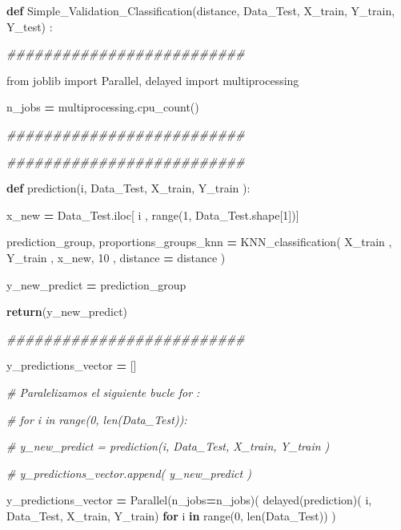 \documentclass[
  11pt,
  a4paper,
]{article}
\newenvironment{Shaded}{\begin{snugshade}}{\end{snugshade}}
\newcommand{\BuiltInTok}[1]{#1}
\newcommand{\CommentTok}[1]{\textcolor[rgb]{0.56,0.35,0.01}{\textit{#1}}}
\newcommand{\ControlFlowTok}[1]{\textcolor[rgb]{0.13,0.29,0.53}{\textbf{#1}}}
\newcommand{\DecValTok}[1]{\textcolor[rgb]{0.00,0.00,0.81}{#1}}
\newcommand{\ImportTok}[1]{#1}
\newcommand{\KeywordTok}[1]{\textcolor[rgb]{0.13,0.29,0.53}{\textbf{#1}}}
\newcommand{\NormalTok}[1]{#1}
\newcommand{\OperatorTok}[1]{\textcolor[rgb]{0.81,0.36,0.00}{\textbf{#1}}}
\begin{document}
\begin{Shaded}
\begin{Highlighting}[]
\KeywordTok{def}\NormalTok{ Simple\_Validation\_Classification(distance, Data\_Test, X\_train, Y\_train, Y\_test) :}

    \CommentTok{\#\#\#\#\#\#\#\#\#\#\#\#\#\#\#\#\#\#\#\#\#\#\#\#\#\#}

    \ImportTok{from}\NormalTok{ joblib }\ImportTok{import}\NormalTok{ Parallel, delayed}
    \ImportTok{import}\NormalTok{ multiprocessing}

\NormalTok{    n\_jobs  }\OperatorTok{=}\NormalTok{ multiprocessing.cpu\_count()}

    \CommentTok{\#\#\#\#\#\#\#\#\#\#\#\#\#\#\#\#\#\#\#\#\#\#\#\#\#\#}

    \CommentTok{\#\#\#\#\#\#\#\#\#\#\#\#\#\#\#\#\#\#\#\#\#\#\#\#\#\#}

    \KeywordTok{def}\NormalTok{ prediction(i, Data\_Test, X\_train, Y\_train ):}

\NormalTok{     x\_new }\OperatorTok{=}\NormalTok{ Data\_Test.iloc[ i , }\BuiltInTok{range}\NormalTok{(}\DecValTok{1}\NormalTok{, Data\_Test.shape[}\DecValTok{1}\NormalTok{])]}

\NormalTok{     prediction\_group, proportions\_groups\_knn  }\OperatorTok{=}\NormalTok{  KNN\_classification( X\_train , Y\_train , x\_new, }\DecValTok{10}\NormalTok{ , distance }\OperatorTok{=}\NormalTok{ distance )}
     
\NormalTok{     y\_new\_predict }\OperatorTok{=}\NormalTok{ prediction\_group}

     \ControlFlowTok{return}\NormalTok{(y\_new\_predict)}

    \CommentTok{\#\#\#\#\#\#\#\#\#\#\#\#\#\#\#\#\#\#\#\#\#\#\#\#\#\#}

\NormalTok{    y\_predictions\_vector }\OperatorTok{=}\NormalTok{ []}

    \CommentTok{\# Paralelizamos el siguiente bucle for :}

    \CommentTok{\# for i in  range(0, len(Data\_Test)):}

        \CommentTok{\# y\_new\_predict = prediction(i, Data\_Test, X\_train, Y\_train )}

        \CommentTok{\# y\_predictions\_vector.append( y\_new\_predict )}

    
\NormalTok{    y\_predictions\_vector }\OperatorTok{=}\NormalTok{ Parallel(n\_jobs}\OperatorTok{=}\NormalTok{n\_jobs)( delayed(prediction)( i, Data\_Test, X\_train, Y\_train) }\ControlFlowTok{for}\NormalTok{ i }\KeywordTok{in} \BuiltInTok{range}\NormalTok{(}\DecValTok{0}\NormalTok{, }\BuiltInTok{len}\NormalTok{(Data\_Test)) )}


\end{Highlighting}
\end{Shaded}
\end{document}
